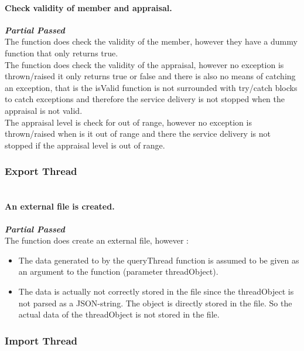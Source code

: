 \paragraph{\color{black}Check validity of member and appraisal.\\}
\color{myOrange}
\textbf{\small \emph{Partial Passed}} \\
\color{black}The function does check the validity of the member, however they have a dummy function that only returns true.\\
The function does check the validity of the appraisal, however no exception is thrown/raised it only returns true or false and there is also no means of catching an exception, that is the isValid function is not surrounded with try/catch blocks to catch exceptions and therefore the service delivery is not stopped when the appraisal is not valid.\\
The appraisal level is check for out of range, however no exception is thrown/raised when is it out of range and there the service delivery is not stopped if the appraisal level is out of range.
\par

\subsubsection{Export Thread }
\paragraph{\color{black}\\An external file is created.\\}
\color{myOrange}
\textbf{\small \emph{Partial Passed}} \\
\color{black}The function does create an external file, however :
	\begin{itemize}
	\item{The data generated to by the queryThread function is assumed to be given as an argument to the function  (parameter threadObject).}
	\item{The data is actually not correctly stored in the file since the threadObject is not parsed as a JSON-string. The object is directly stored in the file. So the actual data of the threadObject is not stored in the file.}
	\end{itemize}
\par

\subsubsection{Import Thread}
